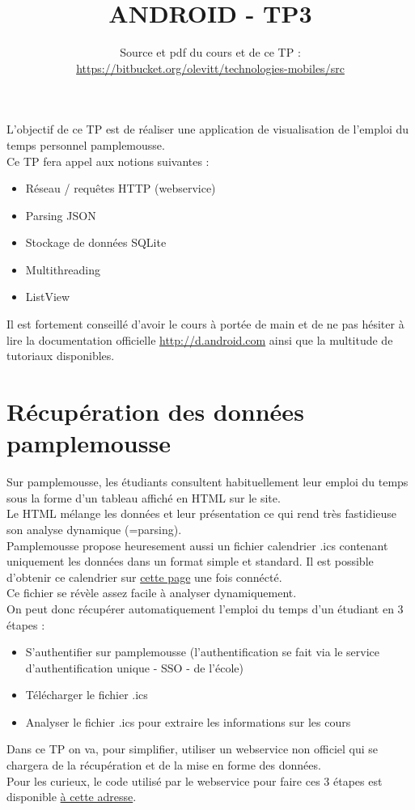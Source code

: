 \documentclass{article}
\title{ANDROID - TP3}
\date{Source et pdf du cours et de ce TP
:\\ \href{https://bitbucket.org/olevitt/technologies-mobiles}{https://bitbucket.org/olevitt/technologies-mobiles/src}}
\begin{document}
\maketitle
L'objectif de ce TP est de réaliser une application de visualisation de
l'emploi du temps personnel pamplemousse.\\
Ce TP fera appel aux notions suivantes :
\begin{itemize}
  \item Réseau / requêtes HTTP (webservice)
  \item Parsing JSON
  \item Stockage de données SQLite
  \item Multithreading
  \item ListView
\end{itemize}
Il est fortement conseillé d'avoir le cours à portée de main et de ne pas hésiter à lire la documentation officielle 
\href{http://d.android.com}{http://d.android.com} ainsi que la multitude de tutoriaux disponibles.\\
\section{Récupération des données pamplemousse}
Sur pamplemousse, les étudiants consultent habituellement leur emploi du temps
sous la forme d'un tableau affiché en HTML sur le site. \\
Le HTML mélange les données et leur présentation ce qui rend très fastidieuse
son analyse dynamique (=parsing). \\
Pamplemousse propose heuresement aussi un fichier calendrier .ics contenant
uniquement les données dans un format simple et standard. Il est possible d'obtenir ce
calendrier sur
\href{http://pamplemousse.ensai.fr/ensai/icalendar.php}{cette page} une fois
connécté.\\
Ce fichier se révèle assez facile à analyser dynamiquement.\\
On peut donc récupérer automatiquement l'emploi du temps d'un étudiant en 3
étapes :
\begin{itemize}
  \item S'authentifier sur pamplemousse (l'authentification se fait via le
  service d'authentification unique - SSO - de l'école)
  \item Télécharger le fichier .ics
  \item Analyser le fichier .ics pour extraire les informations sur les cours
\end{itemize}
Dans ce TP on va, pour simplifier, utiliser un webservice non officiel qui se
chargera de la récupération et de la mise en forme des données.\\
Pour les curieux, le code utilisé par le webservice pour faire ces 3 étapes est
disponible
\href{https://bitbucket.org/olevitt/libpamplemousse/src}{à cette adresse}.
\end{document}
